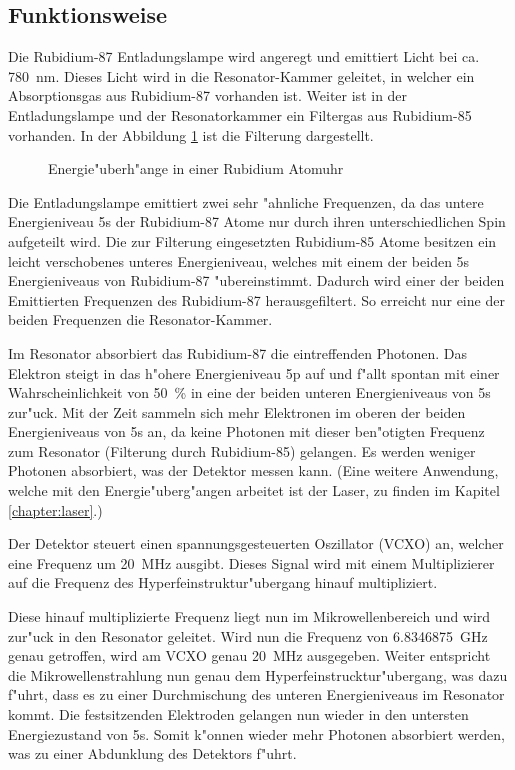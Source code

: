 \begin{refsection}
\subsection{Funktionsweise}
Die Rubidium-87 Entladungslampe wird angeregt und emittiert Licht bei
ca. \SI{780}{\nano\meter}.  Dieses Licht wird in die Resonator-Kammer
geleitet, in welcher ein Absorptionsgas aus Rubidium-87 vorhanden ist.
Weiter ist in der Entladungslampe und der Resonatorkammer ein
Filtergas aus Rubidium-85 vorhanden.  In der Abbildung
\ref{fig:uebergaenge} ist die Filterung dargestellt.

\begin{figure}
  \centering
  
  \caption{Energie"uberh"ange in einer Rubidium Atomuhr}
  \label{fig:uebergaenge}
\end{figure}

Die Entladungslampe emittiert zwei sehr "ahnliche Frequenzen, da das
untere Energieniveau 5s der Rubidium-87 Atome nur durch ihren
unterschiedlichen Spin aufgeteilt wird.  Die zur Filterung
eingesetzten Rubidium-85 Atome besitzen ein leicht verschobenes
unteres Energieniveau, welches mit einem der beiden 5s Energieniveaus
von Rubidium-87 "ubereinstimmt.  Dadurch wird einer der beiden
Emittierten Frequenzen des Rubidium-87 herausgefiltert.  So erreicht
nur eine der beiden Frequenzen die Resonator-Kammer.

Im Resonator absorbiert das Rubidium-87 die eintreffenden
Photonen. Das Elektron steigt in das h"ohere Energieniveau 5p auf und
f"allt spontan mit einer Wahrscheinlichkeit von \SI{50}{\percent} in
eine der beiden unteren Energieniveaus von 5s zur"uck.  Mit der Zeit
sammeln sich mehr Elektronen im oberen der beiden Energieniveaus von
5s an, da keine Photonen mit dieser ben"otigten Frequenz zum Resonator
(Filterung durch Rubidium-85) gelangen.  Es werden weniger Photonen
absorbiert, was der Detektor messen kann.  (Eine weitere Anwendung,
welche mit den Energie"uberg"angen arbeitet ist der Laser, zu finden
im Kapitel \ref{chapter:laser}.)

Der Detektor steuert einen spannungsgesteuerten Oszillator (VCXO) an,
welcher eine Frequenz um \SI{20}{\mega\hertz} ausgibt.  Dieses Signal
wird mit einem Multiplizierer auf die Frequenz des
Hyperfeinstruktur"ubergang hinauf multipliziert.

Diese hinauf multiplizierte Frequenz liegt nun im Mikrowellenbereich
und wird zur"uck in den Resonator geleitet.  Wird nun die Frequenz von
\SI{6.8346875}{\giga\hertz} genau getroffen, wird am VCXO genau
\SI{20}{\mega\hertz} ausgegeben.  Weiter entspricht die
Mikrowellenstrahlung nun genau dem Hyperfeinstrucktur"ubergang, was
dazu f"uhrt, dass es zu einer Durchmischung des unteren Energieniveaus
im Resonator kommt.  Die festsitzenden Elektroden gelangen nun wieder
in den untersten Energiezustand von 5s.  Somit k"onnen wieder mehr
Photonen absorbiert werden, was zu einer Abdunklung des Detektors
f"uhrt.


\end{refsection}
